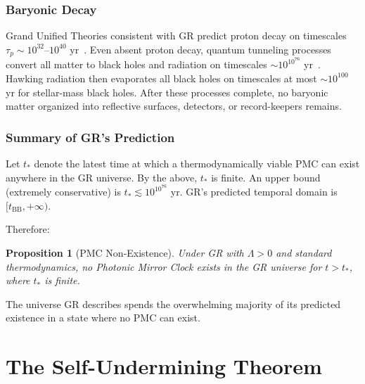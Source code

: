 \documentclass[11pt,a4paper]{article}
\newtheorem{proposition}{Proposition}
\begin{document}
\subsubsection{Baryonic Decay}

Grand Unified Theories consistent with GR predict proton decay on timescales
$\tau_p \sim 10^{32}$--$10^{40}$ yr~\cite{georgi1974}. Even absent proton decay,
quantum tunneling processes convert all matter to black holes and radiation on
timescales $\sim 10^{10^{76}}$ yr~\cite{adams1997}. Hawking radiation then
evaporates all black holes on timescales at most $\sim 10^{100}$ yr for stellar-mass
black holes. After these processes complete, no baryonic matter organized into
reflective surfaces, detectors, or record-keepers remains.

\subsubsection{Summary of GR's Prediction}

Let $t_*$ denote the latest time at which a thermodynamically viable PMC can exist
anywhere in the GR universe. By the above, $t_*$ is finite. An upper bound (extremely
conservative) is $t_* \lesssim 10^{10^{76}}$ yr. GR's predicted temporal domain is
$[t_{\mathrm{BB}}, +\infty)$.

Therefore:

\begin{proposition}[PMC Non-Existence]
\label{prop:pmc}
Under GR with $\Lambda > 0$ and standard thermodynamics, no Photonic Mirror Clock
exists in the GR universe for $t > t_*$, where $t_*$ is finite.
\end{proposition}

\noindent The universe GR describes spends the overwhelming majority of its predicted
existence in a state where no PMC can exist.

\section{The Self-Undermining Theorem}
\label{sec:theorem}
\end{document}
